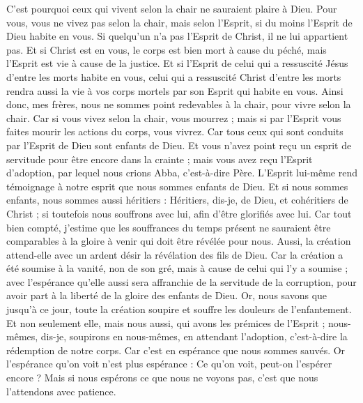 \begin{multicols}{2}
C'est pourquoi ceux qui vivent selon la chair ne sauraient plaire à Dieu.
Pour vous, vous ne vivez pas selon la chair, mais selon l'Esprit, si du moins l'Esprit de Dieu habite en vous. Si quelqu'un n'a pas l'Esprit de Christ, il ne lui appartient pas.
Et si Christ est en vous, le corps est bien mort à cause du péché, mais l'Esprit est vie à cause de la justice.
Et si l'Esprit de celui qui a ressuscité Jésus d’entre les morts habite en vous, celui qui a ressuscité Christ d’entre les morts rendra aussi la vie à vos corps mortels par son Esprit qui habite en vous.
Ainsi donc, mes frères, nous ne sommes point redevables à la chair, pour vivre selon la chair.
Car si vous vivez selon la chair, vous mourrez ; mais si par l'Esprit vous faites mourir les actions du corps, vous vivrez.
Car tous ceux qui sont conduits par l'Esprit de Dieu sont enfants de Dieu.
Et vous n'avez point reçu un esprit de servitude pour être encore dans la crainte ; mais vous avez reçu l'Esprit d'adoption, par lequel nous crions Abba, c'est-à-dire Père.
L’Esprit lui-même rend témoignage à notre esprit que nous sommes enfants de Dieu.
Et si nous sommes enfants, nous sommes aussi héritiers : Héritiers, dis-je, de Dieu, et cohéritiers de Christ ; si toutefois nous souffrons avec lui, afin d’être glorifiés avec lui.
Car tout bien compté, j'estime que les souffrances du temps présent ne sauraient être comparables à la gloire à venir qui doit être révélée pour nous.
Aussi, la création attend-elle avec un ardent désir la révélation des fils de Dieu.
Car la création a été soumise à la vanité, non de son gré, mais à cause de celui qui l’y a soumise ;
avec l’espérance qu’elle aussi sera affranchie de la servitude de la corruption, pour avoir part à la liberté de la gloire des enfants de Dieu.
Or, nous savons que jusqu’à ce jour, toute la création soupire et souffre les douleurs de l’enfantement.
Et non seulement elle, mais nous aussi, qui avons les prémices de l'Esprit ; nous-mêmes, dis-je, soupirons en nous-mêmes, en attendant l'adoption, c'est-à-dire la rédemption de notre corps.
Car c’est en espérance que nous sommes sauvés. Or l’espérance qu’on voit n’est plus espérance : Ce qu’on voit, peut-on l’espérer encore ?
Mais si nous espérons ce que nous ne voyons pas, c'est que nous l'attendons avec patience.

\end{multicols}
